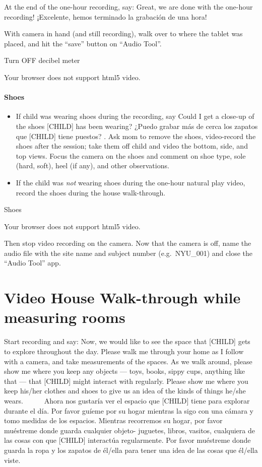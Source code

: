 \documentclass[
  12pt,
]{book}
\providecommand{\tightlist}{%
  \setlength{\itemsep}{0pt}\setlength{\parskip}{0pt}}
\begin{document}
At the end of the one-hour recording, say: Great, we are done with the one-hour recording! ¡Excelente, hemos terminado la grabación de una hora!

With camera in hand (and still recording), walk over to where the tablet was placed, and hit the ``save'' button on ``Audio Tool''.

Turn OFF decibel meter

Your browser does not support html5 video.

\hypertarget{shoes}{%
\paragraph{Shoes}\label{shoes}}

\begin{itemize}
\tightlist
\item
  If child was wearing shoes during the recording, say Could I get a close-up of the shoes {[}CHILD{]} has been wearing? ¿Puedo grabar más de cerca los zapatos que {[}CHILD{]} tiene puestos? . Ask mom to remove the shoes, video-record the shoes after the session; take them off child and video the bottom, side, and top views. Focus the camera on the shoes and comment on shoe type, sole (hard, soft), heel (if any), and other observations.
\item
  If the child was \emph{not} wearing shoes during the one-hour natural play video, record the shoes during the house walk-through.
\end{itemize}

Shoes

Your browser does not support html5 video.

Then stop video recording on the camera. Now that the camera is off, name the audio file with the site name and subject number (e.g.~NYU\_001) and close the ``Audio Tool'' app.

\hypertarget{video-house-walk-through-while-measuring-rooms}{%
\section{Video House Walk-through while measuring rooms}\label{video-house-walk-through-while-measuring-rooms}}

Start recording and say: Now, we would like to see the space that {[}CHILD{]} gets to explore throughout the day. Please walk me through your home as I follow with a camera, and take measurements of the spaces. As we walk around, please show me where you keep any objects --- toys, books, sippy cups, anything like that --- that {[}CHILD{]} might interact with regularly. Please show me where you keep his/her clothes and shoes to give us an idea of the kinds of things he/she wears.
    Ahora nos gustaría ver el espacio que {[}CHILD{]} tiene para explorar durante el día. Por favor guíeme por su hogar mientras la sigo con una cámara y tomo medidas de los espacios. Mientras recorremos su hogar, por favor muéstreme donde guarda cualquier objeto- juguetes, libros, vasitos, cualquiera de las cosas con que {[}CHILD{]} interactúa regularmente. Por favor muéstreme donde guarda la ropa y los zapatos de él/ella para tener una idea de las cosas que él/ella viste.
\end{document}

